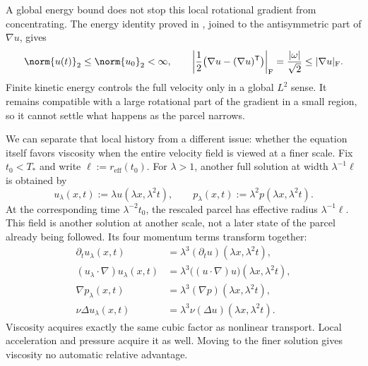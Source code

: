 A global energy bound does not stop this local rotational gradient from concentrating. The energy identity proved in , joined to the antisymmetric part of \(\nabla u\), gives
\[
  \norm{u(t)}_2
  \leq
  \norm{u_0}_2
  <\infty,
  \qquad
  \left|\frac12\bigl(\nabla u-(\nabla u)^{\mathsf T}\bigr)\right|_{\mathrm F}
  =
  \frac{|\omega|}{\sqrt2}
  \leq
  |\nabla u|_{\mathrm F}.
\]
Finite kinetic energy controls the full velocity only in a global \(L^2\) sense. It remains compatible with a large rotational part of the gradient in a small region, so it cannot settle what happens as the parcel narrows.


We can separate that local history from a different issue: whether the equation itself favors viscosity when the entire velocity field is viewed at a finer scale. Fix \(t_0<T_*\) and write \(\ell:=r_{\mathrm{eff}}(t_0)\). For \(\lambda>1\), another full solution at width \(\lambda^{-1}\ell\) is obtained by
\[
  u_\lambda(x,t)
  :=
  \lambda u(\lambda x,\lambda^2t),
  \qquad
  p_\lambda(x,t)
  :=
  \lambda^2p(\lambda x,\lambda^2t).
\]
At the corresponding time \(\lambda^{-2}t_0\), the rescaled parcel has effective radius \(\lambda^{-1}\ell\). This field is another solution at another scale, not a later state of the parcel already being followed. Its four momentum terms transform together:
\[
\begin{aligned}
  \partial_tu_\lambda(x,t)
  &=
  \lambda^3(\partial_tu)(\lambda x,\lambda^2t),
  \\
  (u_\lambda\cdot\nabla)u_\lambda(x,t)
  &=
  \lambda^3\bigl((u\cdot\nabla)u\bigr)(\lambda x,\lambda^2t),
  \\
  \nabla p_\lambda(x,t)
  &=
  \lambda^3(\nabla p)(\lambda x,\lambda^2t),
  \\
  \nu\Delta u_\lambda(x,t)
  &=
  \lambda^3\nu(\Delta u)(\lambda x,\lambda^2t).
\end{aligned}
\]
Viscosity acquires exactly the same cubic factor as nonlinear transport. Local acceleration and pressure acquire it as well. Moving to the finer solution gives viscosity no automatic relative advantage.


